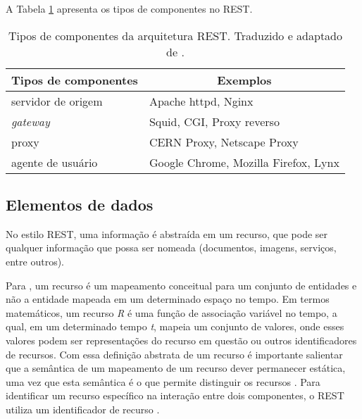     A Tabela \ref{rest-components-elements} apresenta os tipos de componentes no REST.
  
    \begin{table}[ht!]
    \centering
    \caption{Tipos de componentes da arquitetura REST. Traduzido e adaptado de \cite{fielding2002}.}
    \label{rest-components-elements}
    \begin{tabular}{l|l}
    \hline
    \multicolumn{1}{c|}{\textbf{Tipos de componentes}} & \multicolumn{1}{c}{\textbf{Exemplos}} \\ \hline
    servidor de origem                                  & Apache httpd, Nginx                    \\ \hline
    \textit{gateway}                                    & Squid, CGI, Proxy reverso              \\ \hline
    proxy                                               & CERN Proxy, Netscape Proxy             \\ \hline
    agente de usuário                                   & Google Chrome, Mozilla Firefox, Lynx   \\ \hline
    \end{tabular}
    \end{table}
  
  \subsection{Elementos de dados}
    
    No estilo REST, uma informação é abstraída em um recurso, que pode ser qualquer informação que possa ser nomeada
    (documentos, imagens, serviços, entre outros).
    
    Para , um recurso é um mapeamento conceitual para um conjunto de entidades e não a entidade mapeada
    em um determinado espaço no tempo. Em termos matemáticos, um recurso \textit{R} é uma função de associação variável no tempo, a qual, em um 
    determinado tempo \textit{t}, mapeia um conjunto de valores, onde esses valores podem ser representações do recurso em questão ou
    outros identificadores de recursos.
    Com essa definição abstrata de um recurso é importante salientar que a semântica de um mapeamento de um recurso dever permanecer
    estática, uma vez que esta semântica é o que permite distinguir os recursos \cite{fielding2002}.
    Para identificar um recurso específico na interação entre dois componentes, o REST utiliza um identificador de recurso \cite{fielding2002}.
    
